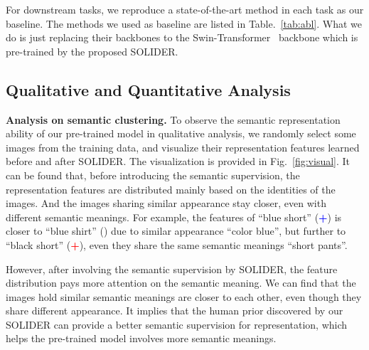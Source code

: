\documentclass[10pt,twocolumn,letterpaper]{article}
\begin{document}
For downstream tasks, we reproduce a state-of-the-art method in each task as our baseline. The methods we used as baseline are listed in Table.~\ref{tab:abl}. What we do is just replacing their backbones to the Swin-Transformer~\cite{swin} backbone which is pre-trained by the proposed SOLIDER.

\subsection{Qualitative and Quantitative Analysis}

\textbf{Analysis on semantic clustering.} To observe the semantic representation ability of our pre-trained model in qualitative analysis, we randomly select some images from the training data, and visualize their representation features learned before and after SOLIDER. The visualization is provided in Fig.~\ref{fig:visual}. It can be found that, before introducing the semantic supervision, the representation features are distributed mainly based on the identities of the images.
And the images sharing similar appearance stay closer, even with different semantic meanings. 
For example, the features of ``blue short'' (\textcolor{blue}{\textbf{+}}) is closer to ``blue shirt'' (\textcolor{red}{}) due to similar appearance ``color blue'', but further to ``black short'' (\textcolor{red}{\textbf{+}}), even they share the same semantic meanings ``short pants''.

However, after involving the semantic supervision by SOLIDER, the feature distribution pays more attention on the semantic meaning. We can find that the images hold similar semantic meanings are closer to each other, even though they share different appearance. 
It implies that the human prior discovered by our SOLIDER can provide a better semantic supervision for representation, which helps the pre-trained model involves more semantic meanings.
\end{document}
